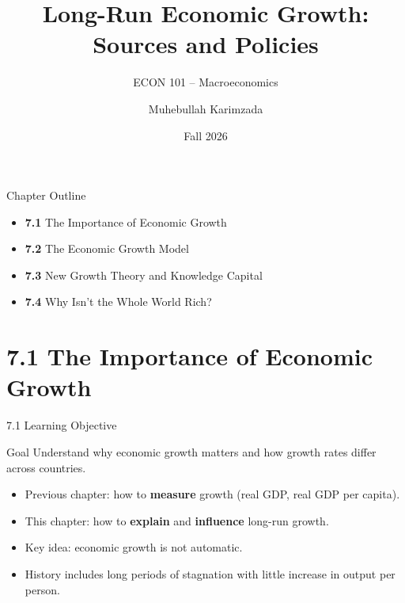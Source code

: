 \documentclass[aspectratio=169]{beamer}
\title{\textbf{Long-Run Economic Growth: Sources and Policies}}
\subtitle{{\large ECON 101 -- Macroeconomics}}
\author{Muhebullah Karimzada}
\date{Fall 2026}
\begin{document}

\begin{frame}[plain]
  \titlepage
\end{frame}

\begin{frame}{Chapter Outline}
\transfade
\begin{itemize}
  \item \textbf{7.1} The Importance of Economic Growth
  \item \textbf{7.2} The Economic Growth Model
  \item \textbf{7.3} New Growth Theory and Knowledge Capital
  \item \textbf{7.4} Why Isn't the Whole World Rich?
\end{itemize}
\end{frame}

\section{7.1 The Importance of Economic Growth}

\begin{frame}{7.1 Learning Objective}
\transfade
\begin{block}{Goal}
Understand why economic growth matters and how growth rates differ across countries.
\end{block}
\begin{itemize}
  \item Previous chapter: how to \textbf{measure} growth (real GDP, real GDP per capita).
  \item This chapter: how to \textbf{explain} and \textbf{influence} long-run growth.
  \item Key idea: economic growth is \alert{not automatic}.
  \item History includes long periods of stagnation with little increase in output per person.
\end{itemize}
\end{frame}
\end{document}
